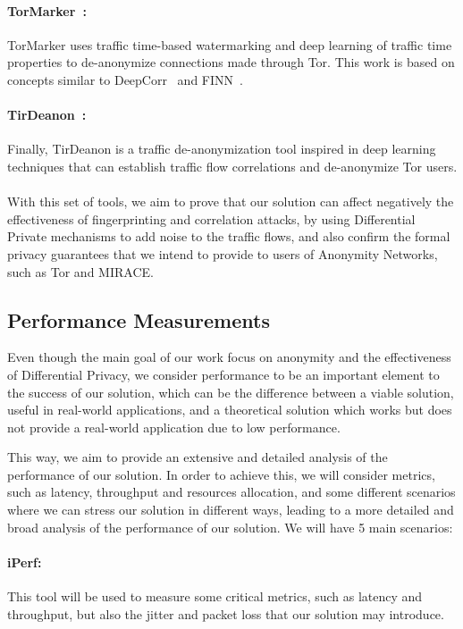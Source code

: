 \paragraph{TorMarker~\cite{TorMarker}:} TorMarker uses traffic time-based watermarking and deep learning of traffic time properties to de-anonymize connections made through Tor. This work is based on concepts similar to DeepCorr~\cite{DeepCorr} and FINN~\cite{FINN}.

\paragraph{TirDeanon~\cite{TirDeanon}:} Finally, TirDeanon is a traffic de-anonymization tool inspired in deep learning techniques that can establish traffic flow correlations and de-anonymize Tor users. 

\paragraph{} With this set of tools, we aim to prove that our solution can affect negatively the effectiveness of fingerprinting and correlation attacks, by using Differential Private mechanisms to add noise to the traffic flows, and also confirm the formal privacy guarantees that we intend to provide to users of Anonymity Networks, such as Tor and MIRACE.


\subsection{Performance Measurements}\label{subsec:performance_measurements}

Even though the main goal of our work focus on anonymity and the effectiveness of Differential Privacy, we consider performance to be an important element to the success of our solution, which can be the difference between a viable solution, useful in real-world applications, and a theoretical solution which works but does not provide a real-world application due to low performance.

This way, we aim to provide an extensive and detailed analysis of the performance of our solution. In order to achieve this, we will consider metrics, such as latency, throughput and resources allocation, and some different scenarios where we can stress our solution in different ways, leading to a more detailed and broad analysis of the performance of our solution. We will have 5 main scenarios:
\paragraph{iPerf:} This tool will be used to measure some critical metrics, such as latency and throughput, but also the jitter and packet loss that our solution may introduce.

